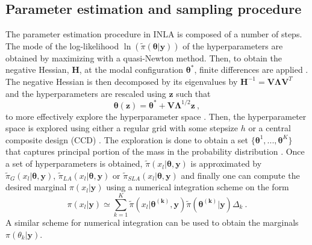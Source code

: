 \subsection{Parameter estimation and sampling procedure}
The parameter estimation procedure in INLA is composed of a number of steps. The mode of the log-likelihood $\ln(\tilde{\pi}(\boldsymbol{\theta} \lvert \mathbf{y}))$ of the hyperparameters are obtained by maximizing with a quasi-Newton method. Then, to obtain the negative Hessian, $\mathbf{H}$, at the modal configuration $\boldsymbol{\theta}^*$, finite differences are applied \citep{gomezrubio2020inla}. The negative Hessian is then decomposed by its eigenvalues by $\mathbf{H}^{-1} = \mathbf{V}\boldsymbol{\Lambda}\mathbf{V}^T$ and the hyperparameters are rescaled using $\mathbf{z}$ such that 
\begin{equation}
    \boldsymbol{\theta}(\mathbf{z}) = \boldsymbol{\theta}^* + \mathbf{V}\boldsymbol{\Lambda}^{1/2}\mathbf{z} \ ,
\end{equation}
to more effectively explore the hyperparameter space \citep{gomezrubio2020inla}. Then, the hyperparameter space is explored using either a regular grid with some stepsize $h$ or a central composite design (CCD) \citep[and references therein]{gomezrubio2020inla}. The exploration is done to obtain a set $\{\boldsymbol{\theta}^1, ..., \boldsymbol{\theta}^K\}$ that captures principal portion of the mass in the probability distribution \citep{martino2019inla}. Once a set of hyperparameters is obtained, $\tilde{\pi}(x_l\lvert\boldsymbol{\theta}, \mathbf{y})$ is approximated by $\tilde{\pi}_G(x_l\lvert\boldsymbol{\theta}, \mathbf{y})$,  $\tilde{\pi}_{LA}(x_l\lvert\boldsymbol{\theta}, \mathbf{y})$ or $\tilde{\pi}_{SLA}(x_l\lvert\boldsymbol{\theta}, \mathbf{y})$ and finally one can compute the desired marginal $\pi(x_l \lvert \mathbf{y})$ using a numerical integration scheme on the form
\begin{equation}
    \label{eq:INLA_marginals_approc}
    \pi(x_l \lvert \mathbf{y}) \simeq \sum_{k=1}^K \tilde{\pi}(x_l \lvert \boldsymbol{\theta^{(k)}}, \mathbf{y}) \tilde{\pi}(\boldsymbol{\theta^{(k)}} \lvert \mathbf{y}) \Delta_k \ .
\end{equation}
A similar scheme for numerical integration can be used to obtain the marginals $\pi(\theta_k \lvert \mathbf{y})$.
